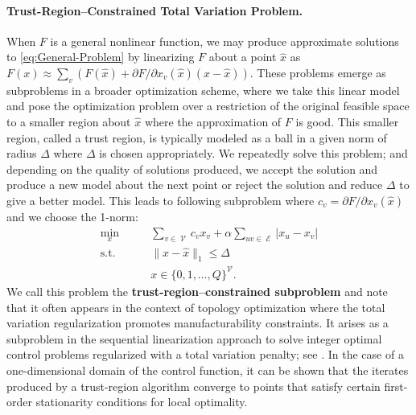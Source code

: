 \documentclass[pdflatex,sn-mathphys-num]{sn-jnl}%
\DeclareMathOperator{\Ecal}{\mathcal{E}}
\DeclareMathOperator{\Vcal}{\mathcal{V}}
\newcommand{\Miles}[1]{\textcolor{teal}{[Miles: #1]}}
\begin{document}
\paragraph{Trust-Region--Constrained Total Variation Problem.}
When $F$ is a general nonlinear function, we may produce approximate solutions to \eqref{eq:General-Problem} by linearizing $F$ about a point $\hat{x}$ as $F(x) \approx \sum_v (F(\hat{x}) + \partial F/\partial x_v(\hat{x})(x- \hat{x}))$.
These problems emerge as subproblems in a broader optimization scheme, where we take this linear model and pose the optimization problem over a restriction of the original feasible space to a smaller region about $\hat{x}$ where the approximation of $F$ is good. This smaller region,  called a trust region, is typically modeled as a ball in a given norm of radius $\Delta$ where $\Delta$ is chosen appropriately. We repeatedly solve this problem; and depending on the quality of solutions produced, we accept the solution and produce a new model about the next point or reject the solution and reduce $\Delta$ to give a better model. This leads to following subproblem where $c_v = \partial F/\partial x_v(\hat{x})$ and we choose the 1-norm:
\begin{subequations}
\begin{align}
    \min_{x} \qquad & \sum_{v\in \Vcal} c_vx_v + \alpha\sum_{uv \in \Ecal} |x_u -x_v|  \\
    \text{s.t.} \qquad &\|x-\hat{x}\|_1 \le \Delta \\
    &x \in \{0,1,\ldots,Q\}^{\Vcal}.
\end{align}\label{eq:trust-region-subproblem}%
\end{subequations}
We call this problem the \textbf{trust-region--constrained subproblem} and note that it often appears in the context of topology optimization where the total variation regularization promotes manufacturability constraints.
It arises as a subproblem in the sequential linearization approach to  solve integer optimal control problems regularized with a total variation penalty; see \cite{leyffer2022sequential}. 
In the case of a one-dimensional domain of the control function, it  can be shown that the iterates produced by a trust-region algorithm converge to points that satisfy certain first-order stationarity conditions for local optimality.


\end{document}
